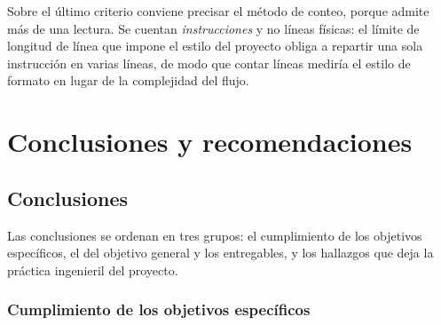 \documentclass[12pt,letterpaper,oneside]{article}
\begin{document}
Sobre el último criterio conviene precisar el método de conteo, porque admite más de una
lectura. Se cuentan \emph{instrucciones} y no líneas físicas: el límite de longitud de línea
que impone el estilo del proyecto obliga a repartir una sola instrucción en varias líneas,
de modo que contar líneas mediría el estilo de formato en lugar de la complejidad del flujo.

\clearpage
\section{Conclusiones y recomendaciones}
\label{sec:conclusiones}

\subsection{Conclusiones}

Las conclusiones se ordenan en tres grupos: el cumplimiento de los objetivos específicos, el
del objetivo general y los entregables, y los hallazgos que deja la práctica ingenieril del
proyecto.

\subsubsection{Cumplimiento de los objetivos específicos}
\end{document}
